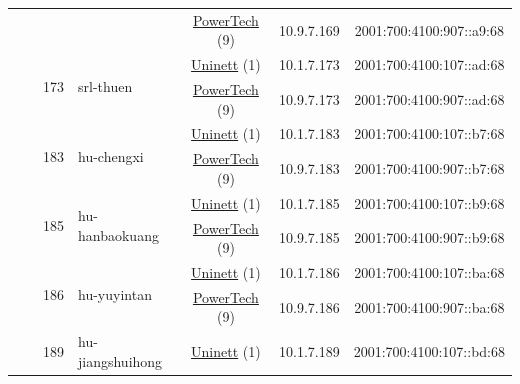 \begin{small}
\begin{center}
\begin{longtable}{|c|c|c|c|c|c|c|c|}
  &  &  &  & \multicolumn{2}{|c|}{\tiny{\href{http://www.powertech.no}{PowerTech} (9)}} & \tiny{10.9.7.169} & \tiny{2001:700:4100:907::a9:68} \\* \cline{3-3}\cline{4-4}\cline{5-5}\cline{6-6}\cline{7-7}\cline{8-8}
  &  & \multirow{2}{*}{\tiny{173}} & \multicolumn{1}{|l|}{\multirow{2}{*}{\tiny{srl-thuen}}} & \multicolumn{2}{|c|}{\tiny{\href{https://www.uninett.no}{Uninett} (1)}} & \tiny{10.1.7.173} & \tiny{2001:700:4100:107::ad:68} \\* \cline{5-5}\cline{6-6}\cline{7-7}\cline{8-8}
  &  &  &  & \multicolumn{2}{|c|}{\tiny{\href{http://www.powertech.no}{PowerTech} (9)}} & \tiny{10.9.7.173} & \tiny{2001:700:4100:907::ad:68} \\* \cline{3-3}\cline{4-4}\cline{5-5}\cline{6-6}\cline{7-7}\cline{8-8}
  &  & \multirow{2}{*}{\tiny{183}} & \multicolumn{1}{|l|}{\multirow{2}{*}{\tiny{hu-chengxi}}} & \multicolumn{2}{|c|}{\tiny{\href{https://www.uninett.no}{Uninett} (1)}} & \tiny{10.1.7.183} & \tiny{2001:700:4100:107::b7:68} \\* \cline{5-5}\cline{6-6}\cline{7-7}\cline{8-8}
  &  &  &  & \multicolumn{2}{|c|}{\tiny{\href{http://www.powertech.no}{PowerTech} (9)}} & \tiny{10.9.7.183} & \tiny{2001:700:4100:907::b7:68} \\* \cline{3-3}\cline{4-4}\cline{5-5}\cline{6-6}\cline{7-7}\cline{8-8}
  &  & \multirow{2}{*}{\tiny{185}} & \multicolumn{1}{|l|}{\multirow{2}{*}{\tiny{hu-hanbaokuang}}} & \multicolumn{2}{|c|}{\tiny{\href{https://www.uninett.no}{Uninett} (1)}} & \tiny{10.1.7.185} & \tiny{2001:700:4100:107::b9:68} \\* \cline{5-5}\cline{6-6}\cline{7-7}\cline{8-8}
  &  &  &  & \multicolumn{2}{|c|}{\tiny{\href{http://www.powertech.no}{PowerTech} (9)}} & \tiny{10.9.7.185} & \tiny{2001:700:4100:907::b9:68} \\* \cline{3-3}\cline{4-4}\cline{5-5}\cline{6-6}\cline{7-7}\cline{8-8}
  &  & \multirow{2}{*}{\tiny{186}} & \multicolumn{1}{|l|}{\multirow{2}{*}{\tiny{hu-yuyintan}}} & \multicolumn{2}{|c|}{\tiny{\href{https://www.uninett.no}{Uninett} (1)}} & \tiny{10.1.7.186} & \tiny{2001:700:4100:107::ba:68} \\* \cline{5-5}\cline{6-6}\cline{7-7}\cline{8-8}
  &  &  &  & \multicolumn{2}{|c|}{\tiny{\href{http://www.powertech.no}{PowerTech} (9)}} & \tiny{10.9.7.186} & \tiny{2001:700:4100:907::ba:68} \\* \cline{3-3}\cline{4-4}\cline{5-5}\cline{6-6}\cline{7-7}\cline{8-8}
  &  & \multirow{2}{*}{\tiny{189}} & \multicolumn{1}{|l|}{\multirow{2}{*}{\tiny{hu-jiangshuihong}}} & \multicolumn{2}{|c|}{\tiny{\href{https://www.uninett.no}{Uninett} (1)}} & \tiny{10.1.7.189} & \tiny{2001:700:4100:107::bd:68} \\* \cline{5-5}\cline{6-6}\cline{7-7}\cline{8-8}

\end{longtable}
\end{center}
\end{small}
